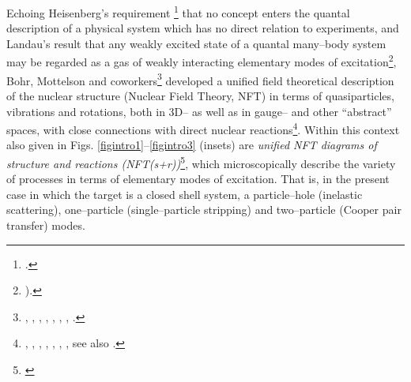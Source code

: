 Echoing Heisenberg's requirement \footnote{\cite{Heisenberg:49}.} that no concept enters the quantal description of a physical system which has no direct relation to experiments, and Landau's result that any weakly excited state of a quantal many--body system may be regarded as a gas of weakly interacting elementary modes of excitation\footnote{\cite{Landau:41}).}, Bohr, Mottelson and coworkers\footnote{\cite{Bohr:69}, \cite{Bohr:76}, \cite{Mottelson:76}, \cite{Bohr:75}, \cite{Bohr:58}, \cite{Belyaev:59}, \cite{Nilsson:55},  \cite{Bes:66}.} developed a unified field theoretical description of the nuclear  structure (Nuclear Field Theory, NFT) in terms of quasiparticles, vibrations and rotations, both in 3D-- as well as in gauge-- and other ``abstract'' spaces, with close connections with direct nuclear reactions\footnote{ \cite{Alder:56}, \cite{Alder:75}, \cite{Broglia:04a}, \cite{Austern:70}, \cite{Glendenning:04}, \cite{Satchler:80}, \cite{Satchler:83}, see also \cite{Potel:13}.}. Within this context also given in Figs. \ref{figintro1}--\ref{figintro3} (insets) are \textit{unified NFT diagrams of structure and reactions (NFT(s+r))}\footnote{ \cite{Broglia:75,Broglia:04a,Broglia:16}}, which microscopically describe the variety of processes in terms of elementary modes of excitation. That is, in the present case in which the target is a closed shell system, a particle--hole (inelastic scattering), one--particle (single--particle stripping) and two--particle (Cooper pair transfer) modes.

